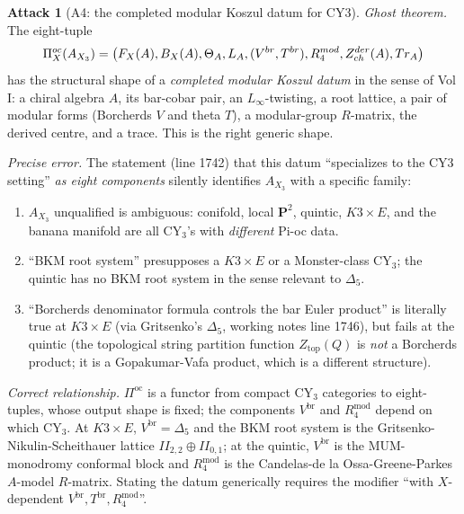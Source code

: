 \documentclass[11pt]{amsart}
\theoremstyle{definition}
\newtheorem{attack}{Attack}
\providecommand{\CY}{\mathrm{CY}}
\providecommand{\cF}{\mathcal{F}}
\providecommand{\cZ}{\mathcal{Z}}
\providecommand{\bP}{\mathbf{P}}
\begin{document}
\begin{attack}[A4: the completed modular Koszul datum for CY3]\leavevmode

\noindent\emph{Ghost theorem.} The eight-tuple
\[
 \Pi^{\mathrm{oc}}_X(A_{X_3}) =
 \bigl(\cF_X(A), \overline{B}_X(A), \Theta_A, L_A, (V^{\mathrm{br}}, T^{\mathrm{br}}),
 R^{\mathrm{mod}}_4, \cZ^{\mathrm{der}}_{\mathrm{ch}}(A), \Tr_A\bigr)
\]
has the structural shape of a {\em completed modular Koszul datum} in
the sense of Vol I: a chiral algebra $A$, its bar-cobar pair, an
$L_\infty$-twisting, a root lattice, a pair of modular forms
(Borcherds $V$ and theta $T$), a modular-group $R$-matrix, the derived
centre, and a trace. This is the right generic shape.

\noindent\emph{Precise error.} The statement (line 1742) that this
datum ``specializes to the CY3 setting'' {\em as eight components}
silently identifies $A_{X_3}$ with a specific family:

\begin{enumerate}[label=(\alph*)]
 \item $A_{X_3}$ unqualified is ambiguous: conifold, local $\bP^2$,
   quintic, $K3 \times E$, and the banana manifold are all CY$_3$'s
   with {\em different} Pi-oc data.
 \item ``BKM root system'' presupposes a $K3 \times E$ or a
   Monster-class CY$_3$; the quintic has no BKM root system in the
   sense relevant to $\Delta_5$.
 \item ``Borcherds denominator formula controls the bar Euler
   product'' is literally true at $K3 \times E$ (via Gritsenko's
   $\Delta_5$, working notes line 1746), but fails at the quintic
   (the topological string partition function $Z_{\mathrm{top}}(Q)$
   is {\em not} a Borcherds product; it is a Gopakumar-Vafa product,
   which is a different structure).
\end{enumerate}

\noindent\emph{Correct relationship.} $\Pi^{\mathrm{oc}}$ is a functor
from compact $\CY_3$ categories to eight-tuples, whose output shape is
fixed; the components $V^{\mathrm{br}}$ and $R^{\mathrm{mod}}_4$
depend on which CY$_3$. At $K3 \times E$, $V^{\mathrm{br}} = \Delta_5$
and the BKM root system is the Gritsenko-Nikulin-Scheithauer lattice
$II_{2,2} \oplus II_{0,1}$; at the quintic, $V^{\mathrm{br}}$ is the
MUM-monodromy conformal block and $R^{\mathrm{mod}}_4$ is the
Candelas-de la Ossa-Greene-Parkes $A$-model $R$-matrix. Stating the
datum generically requires the modifier ``with $X$-dependent
$V^{\mathrm{br}}, T^{\mathrm{br}}, R^{\mathrm{mod}}_4$''.
\end{attack}
\end{document}
